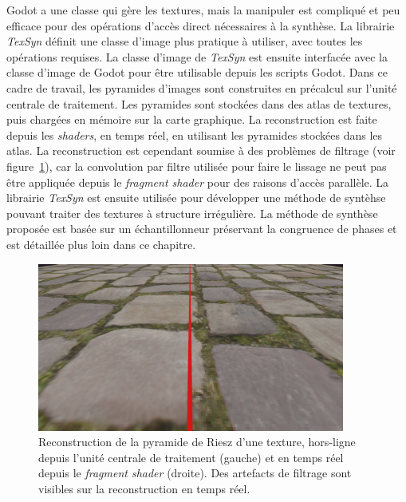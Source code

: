 \bigskip

Godot a une classe qui gère les textures, mais la manipuler est compliqué et peu efficace pour des opérations d'accès direct nécessaires à la synthèse. La librairie \textit{TexSyn} définit une classe d'image plus pratique à utiliser, avec toutes les opérations requises. La classe d'image de \textit{TexSyn} est ensuite interfacée avec la classe d'image de Godot pour être utilisable depuis les scripts Godot. Dans ce cadre de travail, les pyramides d'images sont construites en précalcul sur l'unité centrale de traitement. Les pyramides sont stockées dans des atlas de textures, puis chargées en mémoire sur la carte graphique. La reconstruction est faite depuis les \textit{shaders}, en temps réel, en utilisant les pyramides stockées dans les atlas. La reconstruction est cependant soumise à des problèmes de filtrage (voir figure~\ref{fig:texsyn-reconstruction}), car la convolution par filtre utilisée pour faire le lissage ne peut pas être appliquée depuis le \textit{fragment shader} pour des raisons d'accès parallèle. La librairie \textit{TexSyn} est ensuite utilisée pour développer une méthode de syntèhse pouvant traiter des textures à structure irrégulière. La méthode de synthèse proposée est basée sur un échantillonneur préservant la congruence de phases et est détaillée plus loin dans ce chapitre.

\begin{figure}
    \centering
    \includegraphics[width=0.9\textwidth]{contenu/resources/images/reconstruction_cpu_vs_gpu}
    \caption[Reconstruction de texture dans \textit{TexSyn}]{Reconstruction de la pyramide de Riesz d'une texture, hors-ligne depuis l'unité centrale de traitement (gauche) et en temps réel depuis le \textit{fragment shader} (droite). Des artefacts de filtrage sont visibles sur la reconstruction en temps réel.}
    \label{fig:texsyn-reconstruction}
\end{figure}


